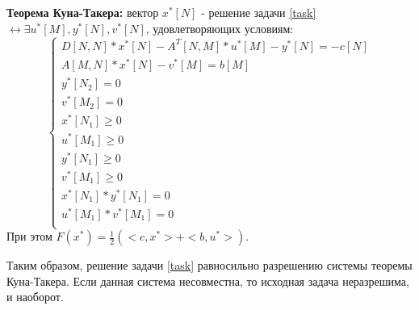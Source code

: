 \textbf{Теорема Куна-Такера:} вектор $x^*[N]$ - решение задачи \eqref{task} $\leftrightarrow \exists u^*[M],y^*[N],v^*[N]$, удовлетворяющих условиям:
\begin{equation}
    \left\{
    \begin{array}{ll}
        D[N,N]*x^*[N]-A^T[N,M]*u^*[M]-y^*[N]=-c[N]\\
        A[M,N]*x^*[N]-v^*[M]=b[M]\\
        y^*[N_2]=0\\
        v^*[M_2]=0\\
        x^*[N_1]\geq0\\
        u^*[M_1]\geq0\\
        y^*[N_1]\geq0\\
        v^*[M_1]\geq0\\
        x^*[N_1]*y^*[N_1]=0\\
        u^*[M_1]*v^*[M_1]=0\\
    \end{array}
    \right.
\end{equation}
При этом $F(x^*)=\frac{1}{2}(<c,x^*>+<b,u^*>)$.

Таким образом, решение задачи \eqref{task} равносильно разрешению системы теоремы Куна-Такера. Если данная система несовместна, то исходная задача неразрешима, и наоборот.

